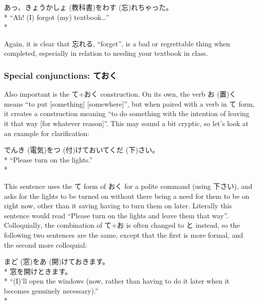\documentclass[11pt, b5paper, twoside, openright, onecolumn]{book}
\makeatletter
\newcommand*{\rubystack}[2]{{\relscale{0.5}%
  \begin{tabular}[b]{@{}c@{}}%
    {#1}\\%
   {\textscale{2}{#2}}%
  \end{tabular}}%
}
\DeclareRobustCommand*{\ruby}[2]{%
  \mbox{%
    \setlength{\parskip}{0ex}%
    \BeginAccSupp{method=pdfstringdef,ActualText={#1}}%
      \rubystack{\phantom{#2}}{#1}%
      \llap{%
        \rubystack{#2}{\phantom{#1}}%
      }%
    \EndAccSupp{}%
  }%
}
\renewcommand*{\ruby}[2]{#2 (#1)}%
\newenvironment{exampleblock}{
\setlength{\parindent}{0.6in}
\begin{minipage}[t]{\dimexpr\textwidth-\parindent}}
{\end{minipage}}
\makeatother
\begin{document}
\vspace{0.4cm}
\begin{exampleblock}
あっ、\ruby{教科書}{きょうかしょ}を\ruby{忘}{わす}れちゃった。 \\* 
“Ah! (I) forgot (my) textbook…” \\* 
\end{exampleblock}
\vspace{0.2cm}

Again‚ it is clear that 忘れる‚ “forget”‚ is a bad or regrettable thing when completed‚ especially in relation to needing your textbook in class.

\subsubsection{Special conjunctions: ておく}

Also important is the て+おく construction. On its own‚ the verb \ruby{置}{お}くmeans “to put [something] [somewhere]”‚ but when paired with a verb in て form‚ it creates a construction meaning “to do something with the intention of leaving it that way [for whatever reason]”. This may sound a bit cryptic‚ so let’s look at an example for clarification:

\vspace{0.4cm}
\begin{exampleblock}
\ruby{電気}{でんき}を\ruby{付}{つ}けておいて\ruby{下}{くだ}さい。 \\* 
“Please turn on the lights.” \\* 
\end{exampleblock}
\vspace{0.2cm}

This sentence uses the て form of おく for a polite command (using 下さい)‚ and asks for the lights to be turned on without there being a need for them to be on right now‚ other than it saving having to turn them on later. Literally this sentence would read “Please turn on the lights and leave them that way”. Colloquially‚ the combination of て+お is often changed to と instead‚ so the following two sentences are the same‚ except that the first is more formal‚ and the second more colloquial:

\vspace{0.4cm}
\begin{exampleblock}
\ruby{窓}{まど}を\ruby{開}{あ}けておきます。 \\* 
窓を開けときます。 \\* 
“(I)’ll open the windows (now‚ rather than having to do it later when it becomes genuinely necessary).” \\* 
\end{exampleblock}
\end{document}
